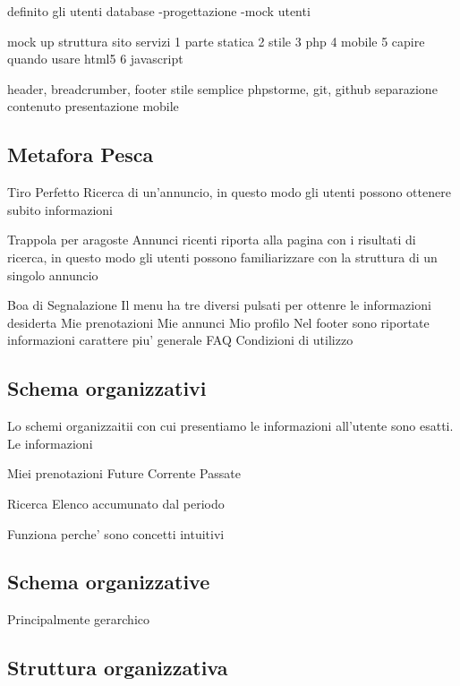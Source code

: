 

definito gli utenti
database
-progettazione
-mock utenti

mock up struttura sito 
servizi
1 parte statica
2 stile
3 php
4 mobile
5 capire quando usare html5
6 javascript

header, breadcrumber, footer
stile semplice
phpstorme, git, github
separazione contenuto presentazione 
mobile


\subsection{Metafora Pesca}

Tiro Perfetto
Ricerca di un'annuncio, in questo modo gli utenti possono ottenere subito informazioni

Trappola per aragoste
Annunci ricenti riporta alla pagina con i risultati di ricerca, in questo modo gli utenti possono familiarizzare con la struttura di un singolo annuncio

Boa di Segnalazione
Il menu ha tre diversi pulsati per ottenre le informazioni desiderta
Mie prenotazioni
Mie annunci
Mio profilo
Nel footer sono riportate informazioni carattere piu' generale
FAQ
Condizioni di utilizzo

\subsection{Schema organizzativi}
Lo schemi organizzaitii con cui presentiamo le informazioni all'utente sono esatti. Le informazioni 


Miei prenotazioni
Future
Corrente
Passate



Ricerca
Elenco accumunato dal periodo 

Funziona perche' sono concetti intuitivi


\subsection{Schema organizzative}
Principalmente gerarchico








\subsection{Struttura organizzativa}
